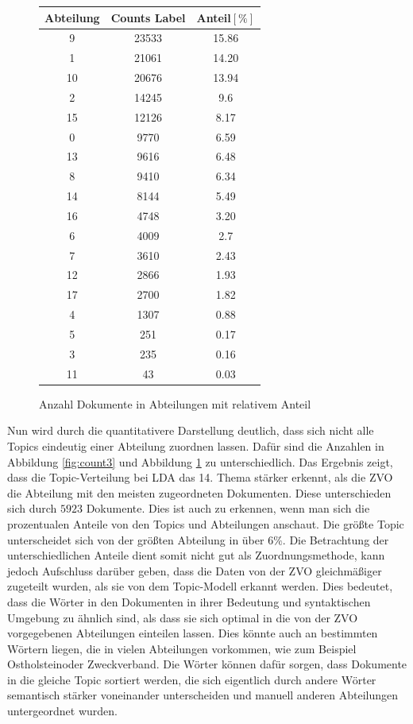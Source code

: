\documentclass[german,version-2020-11]{uzl-thesis}
\begin{document}
\begin{figure}[H]
\begin{center}
\begin{tabular}{ccc}
\hline
\hline
Abteilung & Counts Label & Anteil$[\%]$\\
\hline
9&23533&15.86\\
1&21061&14.20\\
10&20676&13.94\\
2&14245&9.6\\
15&12126&8.17\\
0&9770&6.59\\
13&9616&6.48\\
8&9410&6.34\\
14&8144&5.49\\
16&4748&3.20\\
6&4009&2.7\\
7&3610&2.43\\
12&2866&1.93\\
17&2700&1.82\\
4&1307&0.88\\
5&251& 0.17\\
3&235&0.16\\
11&43&0.03\\
\hline
\hline
\end{tabular}
\caption{Anzahl Dokumente in Abteilungen mit relativem Anteil}
\label{fig:count4}
\end{center}
\end{figure}


Nun wird durch die quantitativere Darstellung deutlich, dass sich nicht alle Topics eindeutig einer Abteilung zuordnen lassen. Dafür sind die Anzahlen in Abbildung \ref{fig:count3} und Abbildung \ref{fig:count4} zu unterschiedlich. Das Ergebnis zeigt, dass die Topic-Verteilung bei LDA das 14. Thema stärker erkennt, als die ZVO die Abteilung mit den meisten zugeordneten Dokumenten. Diese unterschieden sich durch $5923$ Dokumente. Dies ist auch zu erkennen, wenn man sich die prozentualen Anteile von den Topics und Abteilungen anschaut. Die größte Topic unterscheidet sich von der größten Abteilung in über $6\%$. Die Betrachtung der unterschiedlichen Anteile dient somit nicht gut als Zuordnungsmethode, kann jedoch Aufschluss darüber geben, dass die Daten von der ZVO gleichmäßiger zugeteilt wurden, als sie von dem Topic-Modell erkannt werden. Dies bedeutet, dass die Wörter in den Dokumenten in ihrer Bedeutung und syntaktischen Umgebung zu ähnlich sind, als dass sie sich optimal in die von der ZVO vorgegebenen Abteilungen einteilen lassen. Dies könnte auch an bestimmten Wörtern liegen, die in vielen Abteilungen vorkommen, wie zum Beispiel \glqq Ostholstein\grqq oder \glqq Zweckverband\grqq. Die Wörter können dafür sorgen, dass Dokumente in die gleiche Topic sortiert werden, die sich eigentlich durch andere Wörter semantisch stärker voneinander unterscheiden und manuell anderen Abteilungen untergeordnet wurden.\\ 
\end{document}
